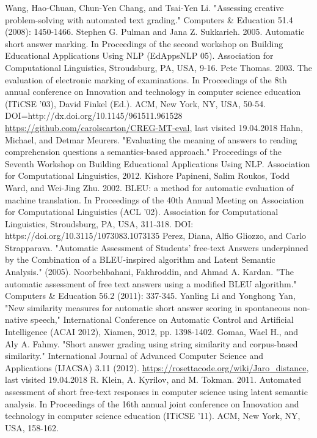 \documentclass[rnd]{mas_report}
\begin{document}
\begin{thebibliography}{3}
 Wang, Hao-Chuan, Chun-Yen Chang, and Tsai-Yen Li. "Assessing creative problem-solving with automated text grading." Computers \& Education 51.4 (2008): 1450-1466.
 Stephen G. Pulman and Jana Z. Sukkarieh. 2005. Automatic short answer marking. In Proceedings of the second workshop on Building Educational Applications Using NLP (EdAppsNLP 05). Association for Computational Linguistics, Stroudsburg, PA, USA, 9-16.
 Pete Thomas. 2003. The evaluation of electronic marking of examinations. In Proceedings of the 8th annual conference on Innovation and technology in computer science education (ITiCSE '03), David Finkel (Ed.). ACM, New York, NY, USA, 50-54. DOI=http://dx.doi.org/10.1145/961511.961528
 \url{https://github.com/carolscarton/CREG-MT-eval}, last visited 19.04.2018
 Hahn, Michael, and Detmar Meurers. "Evaluating the meaning of answers to reading comprehension questions a semantics-based approach." Proceedings of the Seventh Workshop on Building Educational Applications Using NLP. Association for Computational Linguistics, 2012.
 Kishore Papineni, Salim Roukos, Todd Ward, and Wei-Jing Zhu. 2002. BLEU: a method for automatic evaluation of machine translation. In Proceedings of the 40th Annual Meeting on Association for Computational Linguistics (ACL '02). Association for Computational Linguistics, Stroudsburg, PA, USA, 311-318. DOI: https://doi.org/10.3115/1073083.1073135
 Perez, Diana, Alfio Gliozzo, and Carlo Strapparava. "Automatic Assessment of Students’ free-text Answers underpinned by the Combination of a BLEU-inspired algorithm and Latent Semantic Analysis." (2005).
 Noorbehbahani, Fakhroddin, and Ahmad A. Kardan. "The automatic assessment of free text answers using a modified BLEU algorithm." Computers \& Education 56.2 (2011): 337-345.
 Yanling Li and Yonghong Yan, "New similarity measures for automatic short answer scoring in spontaneous non-native speech," International Conference on Automatic Control and Artificial Intelligence (ACAI 2012), Xiamen, 2012, pp. 1398-1402.
 Gomaa, Wael H., and Aly A. Fahmy. "Short answer grading using string similarity and corpus-based similarity." International Journal of Advanced Computer Science and Applications (IJACSA) 3.11 (2012).
 \url{https://rosettacode.org/wiki/Jaro_distance}, last visited 19.04.2018
 R. Klein, A. Kyrilov, and M. Tokman. 2011. Automated assessment of short free-text responses in computer science using latent semantic analysis. In Proceedings of the 16th annual joint conference on Innovation and technology in computer science education (ITiCSE '11). ACM, New York, NY, USA, 158-162.

\end{thebibliography}
\end{document}
